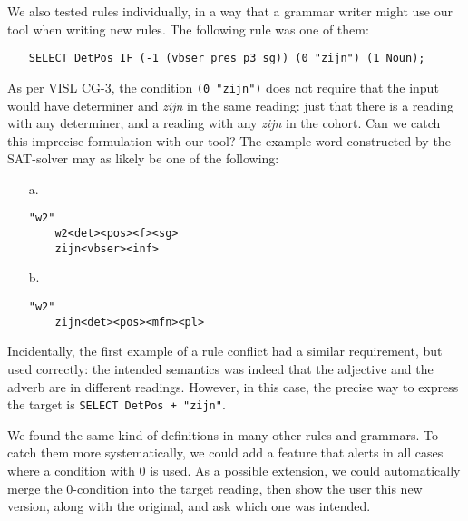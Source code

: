
We also tested rules individually, in a way that a grammar writer might use our tool when writing new rules.
The following rule was one of them:

\begin{itemize}
\item[] 
\texttt{SELECT DetPos IF (-1 (vbser pres p3 sg)) (0 "zijn") (1 Noun);}
\end{itemize} 

As per VISL CG-3, the condition \texttt{(0 "zijn")} does not require
that the input would have determiner and \emph{zijn} in the same reading:
just that there is a reading with any determiner, and a reading with any \emph{zijn} in the cohort. 
Can we catch this imprecise formulation with our tool? The example word constructed by the SAT-solver may as likely be one of the following:

\begin{itemize}
\item[a.] \begin{verbatim}
"w2"
    w2<det><pos><f><sg>
    zijn<vbser><inf>
\end{verbatim}

\item[b.] \begin{verbatim}
"w2"
    zijn<det><pos><mfn><pl>
\end{verbatim}
\end{itemize}

Incidentally, the first example of a rule conflict had a similar
requirement, but used correctly: the intended semantics was indeed
that the adjective and the adverb are in different readings. However,
in this case, the precise way to express the target is \texttt{SELECT DetPos + "zijn"}.

We found the same kind of definitions in many other rules and grammars.
To catch them more systematically, we could add a feature that alerts in all cases where a condition with 0 is used. As a possible extension, we could automatically merge the 0-condition into the target reading, then show the user this new version, along with the original, and ask which one was intended.

